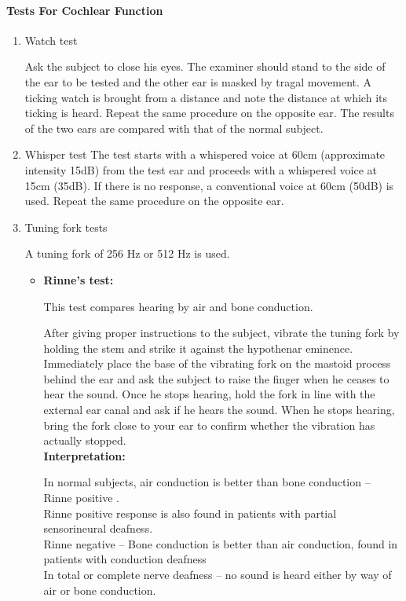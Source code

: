 \documentclass[a4paper,12pt,openany,oneside]{book}
\begin{document}
		\paragraph{Tests For Cochlear Function}
		\begin{enumerate}
\item{Watch test
	\par
	Ask the subject to close his eyes. The examiner should stand to the side of the ear to be tested and the other ear is masked by tragal movement. A ticking watch is brought from a distance and note the distance at which its ticking is heard. Repeat the same procedure on the opposite ear. The results of the two ears are compared with that of the normal subject.}
\item{Whisper test
	The test starts with a whispered voice at 60cm (approximate intensity 15dB) from the test ear and proceeds with a whispered voice at 15cm (35dB). If there is no response, a conventional voice at 60cm (50dB) is used. Repeat the same procedure on the opposite ear.}
\item{Tuning fork tests
	\par
A tuning fork of 256 Hz or 512 Hz is used.
	}
	
				\begin{itemize}
						\renewcommand{\labelitemi}{$\diamond$}

					\item{\textbf{Rinne’s test:}
\par
This test compares hearing by air and bone conduction.
\par
After giving proper instructions to the subject, vibrate the tuning fork by holding the stem and strike it against the hypothenar eminence.
Immediately place the base of the vibrating fork on the mastoid process behind the ear and ask the subject to raise the finger when he ceases to hear the sound.
Once he stops hearing, hold the fork in line with the external ear canal and ask if he hears the sound. When he stops hearing, bring the fork close to your ear to confirm whether the vibration has actually stopped.\\

						\textbf{Interpretation:}
						\par
In normal subjects, air conduction is better than bone conduction – Rinne positive .\\
Rinne positive response is also found in patients with partial sensorineural deafness.\\
Rinne negative – Bone conduction is better than air conduction, found in patients with conduction deafness\\
In total or complete nerve deafness – no sound is heard either by way of air or bone conduction.

}
\end{itemize}
\end{enumerate}
\end{document}
